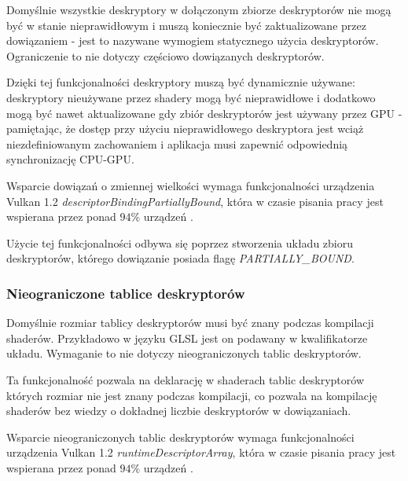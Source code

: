 Domyślnie wszystkie deskryptory w dołączonym zbiorze deskryptorów nie mogą być w stanie nieprawidłowym i muszą koniecznie być zaktualizowane przez dowiązaniem - jest to nazywane wymogiem statycznego użycia deskryptorów.
Ograniczenie to nie dotyczy częściowo dowiązanych deskryptorów.

Dzięki tej funkcjonalności deskryptory muszą być dynamicznie używane: deskryptory nieużywane przez shadery mogą być nieprawidłowe i dodatkowo mogą być nawet aktualizowane gdy zbiór deskryptorów jest używany przez GPU - pamiętając, że dostęp przy użyciu nieprawidłowego deskryptora jest wciąż niezdefiniowanym zachowaniem i aplikacja musi zapewnić odpowiednią synchronizację CPU-GPU.

Wsparcie dowiązań o zmiennej wielkości wymaga funkcjonalności urządzenia Vulkan 1.2 \textit{descriptorBindingPartiallyBound}, która w czasie pisania pracy jest wspierana przez ponad $94\%$ urządzeń \cite{GPUINFO}.

Użycie tej funkcjonalności odbywa się poprzez stworzenia układu zbioru deskryptorów, którego dowiązanie posiada flagę \textit{PARTIALLY\_BOUND}.

\subsubsection {Nieograniczone tablice deskryptorów}

Domyślnie rozmiar tablicy deskryptorów musi być znany podczas kompilacji shaderów. Przykładowo w języku GLSL jest on podawany w kwalifikatorze układu.
Wymaganie to nie dotyczy nieograniczonych tablic deskryptorów.

Ta funkcjonalność pozwala na deklarację w shaderach tablic deskryptorów których rozmiar nie jest znany podczas kompilacji, co pozwala na kompilację shaderów bez wiedzy o dokładnej liczbie deskryptorów w dowiązaniach.

Wsparcie nieograniczonych tablic deskryptorów wymaga funkcjonalności urządzenia Vulkan 1.2 \textit{runtimeDescriptorArray}, która w czasie pisania pracy jest wspierana przez ponad $94\%$ urządzeń \cite{GPUINFO}.

